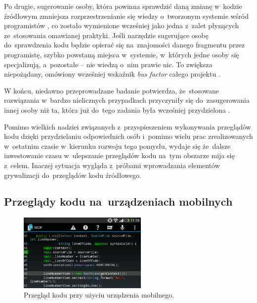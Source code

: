 \documentclass[twoside]{praca}
\begin{document}
Po drugie, sugerowanie osoby, która powinna sprawdzić daną zmianę w~kodzie źródłowym zmniejsza rozprzestrzenianie się wiedzy o~tworzonym systemie wśród programistów \cite{bosu2015characteristics}, co zostało wymienione wcześniej jako jedna z~zalet płynących ze~stosowania omawianej praktyki. Jeśli narzędzie sugerujące osobę do~sprawdzenia kodu będzie opierać się na~znajomości danego fragmentu przez programistę, szybko powstaną miejsca w~systemie, w~których jedne osoby się specjalizują, a~pozostałe -- nie wiedzą o~nim prawie nic. To zwiększa niepożądany, omówiony wcześniej wskaźnik \textit{bus factor} całego projektu \cite{cosentino2015assessing}.

W końcu, niedawno przeprowadzane badanie potwierdza, że~stosowane rozwiązania w~bardzo nielicznych przypadkach przyczyniły się do~zasugerowania innej osoby niż ta, która już do~tego zadania była wcześniej przydzielona \cite{kovalenko2018does}. 

Pomimo wielkich nadziei związanych z~przyspieszeniem wykonywania przeglądów kodu dzięki przydzielaniu odpowiednich osób i~pomimo wielu prac zrealizowanych w~ostatnim czasie w~kierunku rozwoju tego pomysłu, wydaje się że~dalsze inwestowanie czasu w~ulepszanie przeglądów kodu na~tym obszarze mija się z~celem. Inaczej sytuacja wygląda z~próbami wprowadzania elementów grywalizacji do~przeglądów kodu źródłowego.

\subsection{Przeglądy kodu na~urządzeniach mobilnych}

\begin{figure}
\centering
\includegraphics[width=0.56\textwidth]{related/mcr.png}
\caption{Przegląd kodu przy użyciu urządzenia mobilnego.}
\label{fig:related:mcr}
\end{figure}
\end{document}
